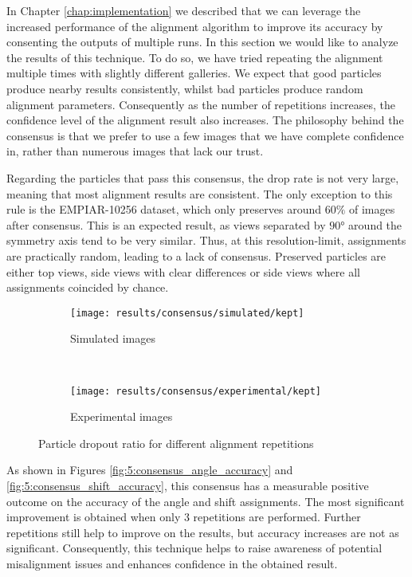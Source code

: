 \documentclass[../main.tex]{subfiles}
\begin{document}
In Chapter \ref{chap:implementation} we described that we can leverage the increased performance of the alignment algorithm to improve its accuracy by consenting the outputs of multiple runs. In this section we would like to analyze the results of this technique. To do so, we have tried repeating the alignment multiple times with slightly different galleries. We expect that good particles produce nearby results consistently, whilst bad particles produce random alignment parameters. Consequently as the number of repetitions increases, the confidence level of the alignment result also increases. The philosophy behind the consensus is that we prefer to use a few images that we have complete confidence in, rather than numerous images that lack our trust.

Regarding the particles that pass this consensus, the drop rate is not very large, meaning that most alignment results are consistent. The only exception to this rule is the EMPIAR-10256 dataset, which only preserves around $60 \si{\percent}$ of images after consensus. This is an expected result, as views separated by $90 \si{\degree}$ around the symmetry axis tend to be very similar. Thus, at this resolution-limit, assignments are practically random, leading to a lack of consensus. Preserved particles are either top views, side views with clear differences or side views where all assignments coincided by chance.

\begin{figure}[htbp]
    \centering
    \begin{subfigure}[b]{.8\textwidth}
         \centering
         \texttt{[image: results/consensus/simulated/kept]}
         \caption{Simulated images}
    \end{subfigure}\\
    \vspace{2em}
    \begin{subfigure}[b]{.8\textwidth}
         \centering
         \texttt{[image: results/consensus/experimental/kept]}
         \caption{Experimental images}
    \end{subfigure}
    \caption{Particle dropout ratio for different alignment repetitions}
    \label{fig:5:consensus_particles}
\end{figure}

As shown in Figures \ref{fig:5:consensus_angle_accuracy} and \ref{fig:5:consensus_shift_accuracy}, this consensus has a measurable positive outcome on the accuracy of the angle and shift assignments. The most significant improvement is obtained when only 3 repetitions are performed. Further repetitions still help to improve on the results, but accuracy increases are not as significant. Consequently, this technique helps to raise awareness of potential misalignment issues and enhances confidence in the obtained result.
\end{document}
